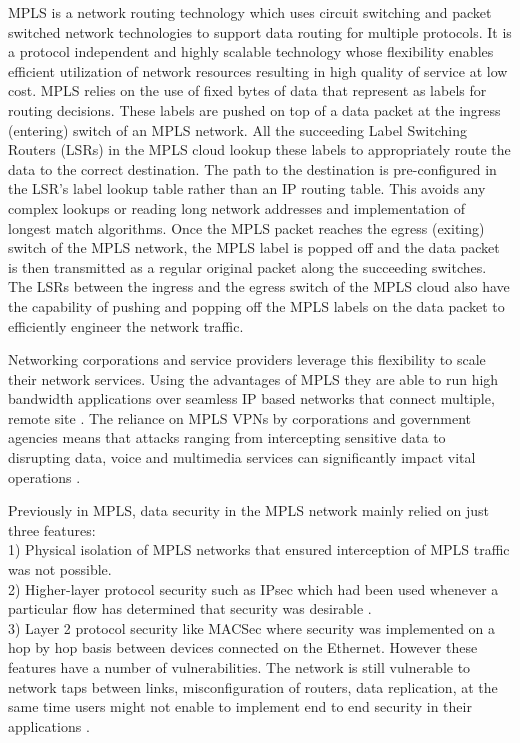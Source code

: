 \documentclass[a4paper, 12pt, oneside]{report}         %
\begin{document}
\begin{thesissummary}                           %

MPLS is a network routing technology which uses circuit switching and packet switched network technologies to support data routing for multiple protocols. It is a protocol independent and highly scalable technology whose flexibility enables efficient utilization of network resources resulting in high quality of service at low cost. MPLS relies on the use of fixed bytes of data that represent as labels for routing decisions. These labels are pushed on top of a data packet at the ingress (entering) switch of an MPLS network. All the succeeding Label Switching Routers (LSRs) in the MPLS cloud lookup these labels to appropriately route the data to the correct destination. The path to the destination is pre-configured in the LSR's label lookup table rather than an IP routing table. This avoids any complex lookups or reading long network addresses and implementation of longest match algorithms. Once the MPLS packet reaches the egress (exiting) switch of the MPLS network, the MPLS label is popped off and the data packet is then transmitted as a regular original packet along the succeeding switches. The LSRs between the ingress and the egress switch of the MPLS cloud also have the capability of pushing and popping off the MPLS labels on the data packet to efficiently engineer the network traffic.

	Networking corporations and service providers leverage this flexibility to scale their network services. Using the advantages of MPLS they are able to run high bandwidth applications over seamless IP based networks that connect multiple, remote site \cite{grayson2009analysis}. The reliance on MPLS VPNs by corporations and government agencies means that attacks ranging from intercepting sensitive data to disrupting data, voice and multimedia services can significantly impact vital operations \cite{mpls-os-internet-draft}.

	Previously in MPLS, data security in the MPLS network mainly relied on just three features: \\
    1) Physical isolation of MPLS networks that ensured interception of MPLS traffic was not possible. \\
    2) Higher-layer protocol security such as IPsec which had been used whenever a particular flow has determined that security was desirable \cite{grayson2009analysis}.\\
    3) Layer 2 protocol security like MACSec where security was implemented on a hop by hop basis between devices connected on the Ethernet. 
    However these features have a number of vulnerabilities. The network is still vulnerable to network taps between links, misconfiguration of routers, data replication, at the same time users might not enable to implement end to end security in their applications \cite{grayson2009analysis}.
    

\end{thesissummary}
\end{document}
